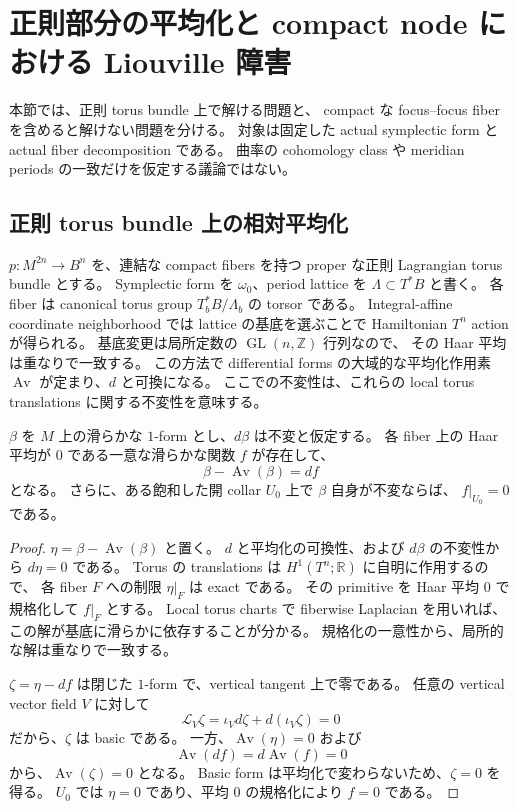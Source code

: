 \section{正則部分の平均化と compact node における Liouville 障害}
\label{lc:liouville}

本節では、正則 torus bundle 上で解ける問題と、
compact な focus--focus fiber を含めると解けない問題を分ける。
対象は固定した actual symplectic form と actual fiber decomposition である。
曲率の cohomology class や meridian periods の一致だけを仮定する議論ではない。

\subsection{正則 torus bundle 上の相対平均化}
\label{lc:liouville-average}

$p:M^{2n}\to B^n$ を、連結な compact fibers を持つ
proper な正則 Lagrangian torus bundle とする。
Symplectic form を $\omega_0$、period lattice を
$\Lambda\subset T^*B$ と書く。
各 fiber は canonical torus group $T_b^*B/\Lambda_b$ の torsor である。
Integral-affine coordinate neighborhood では lattice の基底を選ぶことで
Hamiltonian $T^n$ action が得られる。
基底変更は局所定数の $\operatorname{GL}(n,\mathbb Z)$ 行列なので、
その Haar 平均は重なりで一致する。
この方法で differential forms の大域的な平均化作用素
$\operatorname{Av}$ が定まり、$d$ と可換になる。
ここでの不変性は、これらの local torus translations に関する不変性を意味する。

\begin{proposition}
\label{lc:liouville-average-prop}
$\beta$ を $M$ 上の滑らかな $1$-form とし、$d\beta$ は不変と仮定する。
各 fiber 上の Haar 平均が $0$ である一意な滑らかな関数 $f$ が存在して、
\[
 \beta-\operatorname{Av}(\beta)=df
\]
となる。
さらに、ある飽和した開 collar $U_0$ 上で $\beta$ 自身が不変ならば、
$f|_{U_0}=0$ である。
\end{proposition}

\begin{proof}
$\eta=\beta-\operatorname{Av}(\beta)$ と置く。
$d$ と平均化の可換性、および $d\beta$ の不変性から $d\eta=0$ である。
Torus の translations は $H^1(T^n;\mathbb R)$ に自明に作用するので、
各 fiber $F$ への制限 $\eta|_F$ は exact である。
その primitive を Haar 平均 $0$ で規格化して $f|_F$ とする。
Local torus charts で fiberwise Laplacian を用いれば、
この解が基底に滑らかに依存することが分かる。
規格化の一意性から、局所的な解は重なりで一致する。

$\zeta=\eta-df$ は閉じた $1$-form で、vertical tangent 上で零である。
任意の vertical vector field $V$ に対して
\[
 \mathcal L_V\zeta
 =\iota_Vd\zeta+d(\iota_V\zeta)=0
\]
だから、$\zeta$ は basic である。
一方、$\operatorname{Av}(\eta)=0$ および
\[
 \operatorname{Av}(df)=d\operatorname{Av}(f)=0
\]
から、$\operatorname{Av}(\zeta)=0$ となる。
Basic form は平均化で変わらないため、$\zeta=0$ を得る。
$U_0$ では $\eta=0$ であり、平均 $0$ の規格化により $f=0$ である。
\end{proof}

